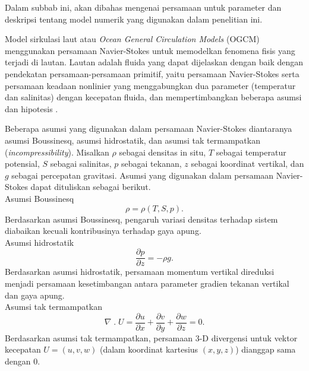 \begin{spacing}{1.5}
	\par Dalam subbab ini, akan dibahas mengenai persamaan untuk parameter dan deskripsi tentang model numerik yang digunakan dalam penelitian ini.
	
	Model sirkulasi laut atau \textit{Ocean General Circulation Models} (OGCM) menggunakan persamaan Navier-Stokes untuk memodelkan fenomena fisis yang terjadi di lautan. Lautan adalah fluida yang dapat dijelaskan dengan baik dengan pendekatan persamaan-persamaan primitif, yaitu persamaan Navier-Stokes serta persamaan keadaan nonlinier yang menggabungkan dua parameter (temperatur dan salinitas) dengan kecepatan fluida, dan mempertimbangkan beberapa asumsi dan hipotesis .
	
	Beberapa asumsi yang digunakan dalam persamaan Navier-Stokes diantaranya asumsi Boussinesq, asumsi hidrostatik, dan asumsi tak termampatkan (\textit{incompressibility}). Misalkan $\rho$ sebagai densitas in situ, $T$ sebagai temperatur potensial, $S$ sebagai salinitas, $p$ sebagai tekanan, $z$ sebagai koordinat vertikal, dan $g$ sebagai percepatan gravitasi. Asumsi yang digunakan dalam persamaan Navier-Stokes dapat dituliskan sebagai berikut.\\
	Asumsi Boussinesq
	\begin{equation}\label{eq:P1}
		\rho = \rho(T,S,p).
	\end{equation}
	Berdasarkan asumsi Boussinesq, pengaruh variasi densitas terhadap sistem diabaikan kecuali kontribusinya terhadap gaya apung.\\
	Asumsi hidrostatik
	\begin{equation}
		\frac{\partial p}{\partial z} = -\rho g.
	\end{equation}
	Berdasarkan asumsi hidrostatik, persamaan momentum vertikal direduksi menjadi persamaan kesetimbangan antara parameter gradien tekanan vertikal dan gaya apung.\\
	Asumsi tak termampatkan
	\begin{equation}
		\nabla \;.\; U =\frac{\partial u}{\partial x} + \frac{\partial v}{\partial y} + \frac{\partial w}{\partial z} = 0.
	\end{equation}	
	Berdasarkan asumsi tak termampatkan, persamaan 3-D divergensi untuk vektor kecepatan $U = (u,v,w)$ (dalam koordinat kartesius $(x,y,z)$) dianggap sama dengan 0.
	

\end{spacing}

